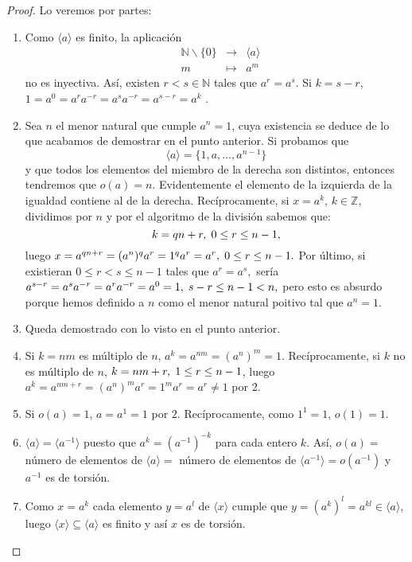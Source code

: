 \documentclass[12pt]{article}
\begin{document}
\begin{proof}Lo veremos por partes: 
\begin{enumerate}
\item Como $\langle a \rangle$ es finito, la aplicación 
$$
\begin{array}{rccl}
&\mathbb{N} \backslash \lbrace 0 \rbrace & \longrightarrow &\langle a \rangle\\
&m& \longmapsto &a^{m}
\end{array}
$$ no es inyectiva. Así, existen $r<s \in \mathbb{N}$ tales que $a^{r} = a^{s}.$ Si $k = s - r$, $1 = a^{0} = a^{r}a^{-r} = a^{s}a^{-r} = a^{s-r} = a^{k}$ .
\item Sea $n$ el menor natural que cumple $a^{n} = 1$, cuya existencia se deduce de lo que acabamos de demostrar en el punto anterior. Si probamos que $$\langle a \rangle = \lbrace 1, a, \ldots, a^{n-1} \rbrace$$ y que todos los elementos del miembro de la derecha son distintos, entonces tendremos que $o(a) = n$.
Evidentemente el elemento de la izquierda de la igualdad contiene al de la derecha. Recíprocamente, si $x = a^{k}$, $k \in \mathbb{Z}$, dividimos por $n$ y por el algoritmo de la división sabemos que: $$k = qn + r, \hspace{0.1cm} 0\leq r \leq n-1,$$ luego $x = a^{qn+r}= (a^{n})^{q}a^{r} = 1^{q}a^{r} = a^{r}, \hspace{0.1cm}  0\leq r \leq n-1.$ Por último, si existieran $0\leq r < s \leq n-1$ tales que $a^{r} = a^{s},$ sería $a^{s-r} = a^{s}a^{-r} = a^{r}a^{-r} = a^{0} = 1, \hspace{0.1cm} s-r \leq n-1 < n,$ pero esto es absurdo porque hemos definido a $n$ como el menor natural poitivo tal que $a^{n} = 1$.
\item Queda demostrado con lo visto en el punto anterior.
\item Si $k = nm$ es múltiplo de $n$, $a^{k} = a^{nm} = (a^{n})^{m} = 1.$ Recíprocamente, si $k$ no es múltiplo de $n$, $k = nm + r, \hspace{0.1cm} 1\leq r\leq n-1$, luego $a^{k} = a^{nm + r} = (a^{n})^{m}a^{r} = 1^{m}a^{r} = a^{r} \neq 1$ por 2.
\item Si $o(a) =1$, $a = a^1 = 1$ por $2.$ Recíprocamente, como $1^1 = 1$, $o(1) = 1$.
\item $\langle a \rangle = \langle a^{-1} \rangle$ puesto que $a^k = (a^{-1})^{-k}$ para cada entero $k$. Así, $o(a) =$ número de elementos de $\langle a \rangle =$ número de elementos de $\langle a^{-1} \rangle = o(a^{-1})$ y $a^{-1}$ es de torsión.
\item Como $x = a^k$ cada elemento $y=a^l$ de $\langle x \rangle$ cumple que $y=(a^k)^l = a^{kl} \in \langle a \rangle$, luego $\langle x \rangle \subseteq \langle a \rangle$ es finito y así $x$ es de torsión.


\end{enumerate}
\end{proof}
\end{document}
